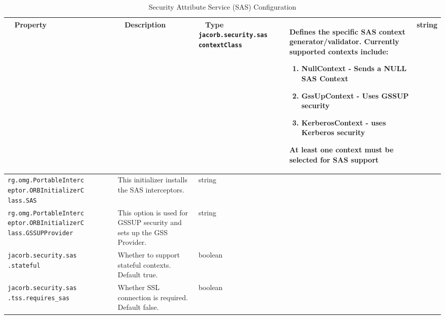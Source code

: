 \begin{small}
\begin{longtable}{|p{5cm}|p{9cm}|p{2cm}|}
\caption{Security Attribute Service (SAS) Configuration}\\
\hline
~ \hfill \textbf {Property} \hfill ~ & ~ \hfill \textbf {Description} \hfill ~ & ~ \hfill \textbf {Type} \hfill ~ \endhead
\hline
\verb"jacorb.security.sas"
\verb"contextClass" & Defines the specific SAS context generator/validator. Currently supported contexts include:
\begin{enumerate}
\item NullContext       - Sends a NULL SAS Context
\item GssUpContext      - Uses GSSUP security
\item KerberosContext   - uses Kerberos security
\end{enumerate}
At least one context must be selected for SAS support & string \\
\hline
\verb"rg.omg.PortableInterc"
\verb"eptor.ORBInitializerC"
\verb"lass.SAS" & This initializer installs the SAS interceptors. & string \\
\hline
\verb"rg.omg.PortableInterc"
\verb"eptor.ORBInitializerC"
\verb"lass.GSSUPProvider" & This option is used for GSSUP security and sets up the GSS Provider. & string \\
\hline
\verb"jacorb.security.sas"
\verb".stateful" & Whether to support stateful contexts. Default true. & boolean \\
\hline
\verb"jacorb.security.sas"
\verb".tss.requires_sas" & Whether SSL connection is required. Default false. & boolean \\
\hline
\end{longtable}
\end{small}




